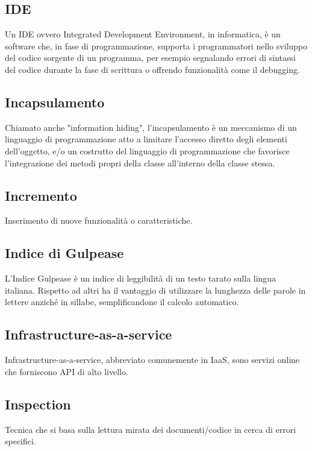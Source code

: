 

\subsection*{IDE}
Un IDE ovvero Integrated Development Environment, in informatica, è un software che, in fase di programmazione, supporta i programmatori nello sviluppo del codice sorgente di un programma, per esempio segnalando errori di sintassi del codice durante la fase di scrittura o offrendo funzionalità come il debugging.

\subsection*{Incapsulamento}
Chiamato anche "information hiding", l'incapsulamento è un meccanismo di un linguaggio di programmazione atto a limitare l'accesso diretto degli elementi dell'oggetto, e/o un costrutto del linguaggio di programmazione che favorisce l'integrazione dei metodi propri della classe all'interno della classe stessa.

\subsection*{Incremento}
Inserimento di nuove funzionalità o caratteristiche.

\subsection*{Indice di Gulpease}
L'Indice Gulpease è un indice di leggibilità di un testo tarato sulla lingua italiana. Rispetto ad altri ha il vantaggio di utilizzare la lunghezza delle parole in lettere anziché in sillabe, semplificandone il calcolo automatico.

\subsection*{Infrastructure-as-a-service}
Infrastructure-as-a-service, abbreviato comunemente in IaaS, sono servizi online che forniscono API di alto livello.

\subsection*{Inspection}
Tecnica che si basa sulla lettura mirata dei documenti/codice in cerca di errori specifici.

